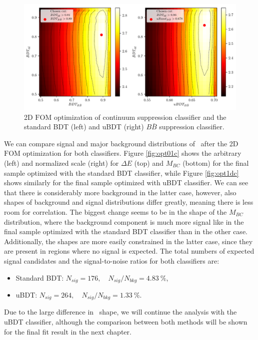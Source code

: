 \begin{figure}[H]
	\centering
	\captionsetup{width=0.8\linewidth}
	\includegraphics[width=\linewidth]{fig/mva_fom}
	\caption{2D $\mathrm{FOM}$ optimization of continuum suppression classifier and the standard BDT (left) and uBDT (right) $B\bar B$ suppression classifier.}
	\label{fig:mvafom}
\end{figure}

We can compare signal and major background distributions of \vars~after the 2D $\mathrm{FOM}$ optimization for both classifiers. Figure \ref{fig:opt01c} shows the arbitrary (left) and normalized scale (right) for $\Delta E$ (top) and $M_{BC}$ (bottom) for the final sample optimized with the standard BDT classifier, while Figure \ref{fig:opt1dc} shows similarly for the final sample optimized with uBDT classifier. We can see that there is considerably more background in the latter case, however, also shapes of background and signal distributions differ greatly, meaning there is less room for correlation. The biggest change seems to be in the shape of the $M_{BC}$ distribution, where the background component is much more signal like in the final sample optimized with the standard BDT classifier than in the other case.  Additionally, the shapes are more easily constrained in the latter case, since they are present in regions where no signal is expected. The total numbers of expected signal candidates and the signal-to-noise ratios for both classifiers are:
\begin{itemize}
	\item Standard BDT: $N_{sig} = 176,\quad N_{sig}/N_{bkg} = 4.83~\%$,
	\item uBDT: $N_{sig} = 264,\quad N_{sig}/N_{bkg} = 1.33~\%$.
\end{itemize}
Due to the large difference in \vars~shape, we will continue the analysis with the uBDT classifier, although the comparison between both methods will be shown for the final fit result in the next chapter.

